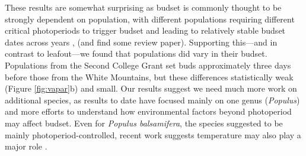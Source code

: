 \documentclass{article}[12pt]
\begin{document}
These results are somewhat surprising as budset is commonly thought to be strongly dependent on population, with different populations requiring different critical photoperiods to trigger budset and leading to relatively stable budset dates across years \citep{Soolanayakanahally2013}, (and find some review paper). Supporting this---and in contrast to leafout---we found that populations did vary in their budset. Populations from the Second College Grant set buds approximately three days before those from the White Mountains, but these differences statistically weak (Figure \ref{fig:vapar}b) and small. Our results suggest we need much more work on additional species, as results to date have focused mainly on one genus (\emph{Populus}) and more efforts to understand how environmental factors beyond photoperiod may affect budset. Even for \emph{Populus balsamifera}, the species suggested to be mainly photoperiod-controlled, recent work suggests temperature may also play a major role \citep{Michelson2018}.   
\end{document}
